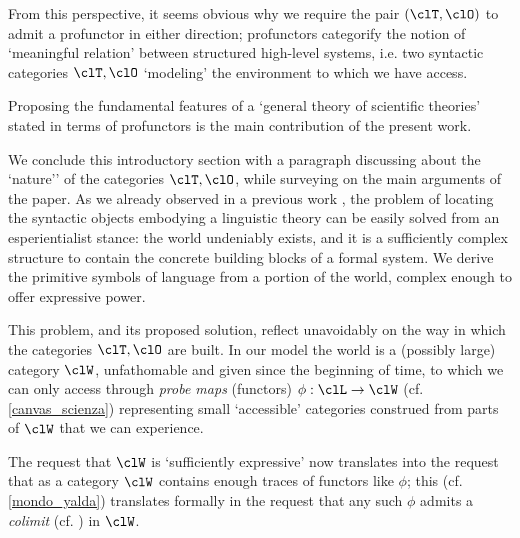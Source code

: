 From this perspective, it seems obvious why we require the pair $(\clT,\clO)$ to admit a profunctor in either direction; profunctors categorify the notion of `meaningful relation' between structured high-level systems, i.e. two syntactic categories $\clT,\clO$ `modeling' the environment to which we have access.

Proposing the fundamental features of a `general theory of scientific theories' stated in terms of profunctors is the main contribution of the present work.

\medskip
We conclude this introductory section with a paragraph discussing about the `nature'' of the categories $\clT,\clO$, while surveying on the main arguments of the paper.
As we already observed in a previous work \cite{catont1}, the problem of locating the syntactic objects embodying a linguistic theory can be easily solved from an esperientialist stance: the world undeniably exists, and it is a sufficiently complex structure to contain the concrete building blocks of a formal system. We derive the primitive symbols of language from a portion of the world, complex enough to offer expressive power.

This problem, and its proposed solution, reflect unavoidably on the way in which the categories $\clT,\clO$ are built. In our model the world is a (possibly large) category $\clW$, unfathomable and given since the beginning of time, to which we can only access through \emph{probe maps} (functors) $\phi : \clL \to \clW$ (cf. \autoref{canvas_scienza}) representing small `accessible' categories construed from parts of $\clW$ that we can experience.

The request that $\clW$ is `sufficiently expressive' now translates into the request that as a category $\clW$ contains enough traces of functors like $\phi$; this (cf. \autoref{mondo_yalda}) translates formally in the request that any such $\phi$ admits a \emph{colimit} (cf. \cite[Ch. 2]{Bor1}) in $\clW$.

